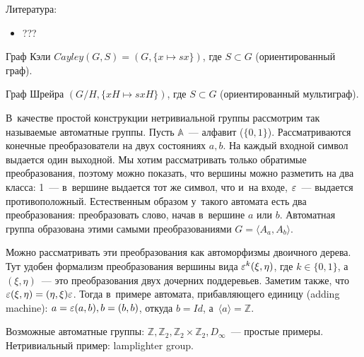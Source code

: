 \documentclass{article}
\begin{document}
Литература:
\begin{itemize}
	\item ???
\end{itemize}

\begin{definition}
	Граф Кэли $Cayley(G, S) = (G, \{x \mapsto sx\})$, где $S \subset G$ (ориентированный граф).
\end{definition}

\begin{definition}
	Граф Шрейра $(G / H, \{xH \mapsto sxH\})$, где $S \subset G$ (ориентированный мультиграф).
\end{definition}

В~качестве простой конструкции нетривиальной группы рассмотрим так называемые автоматные группы.
Пусть $\mathbb{A}$~--- алфавит ($\{0, 1\}$). Рассматриваются конечные преобразователи на двух
состояниях $a, b$. На каждый входной символ выдается один выходной.  Мы хотим рассматривать только
обратимые преобразования, поэтому можно показать, что вершины можно разметить на два класса:
1~--- в~вершине выдается тот же символ, что и~на входе, $\varepsilon$~--- выдается противоположный.
Естественным образом у~такого автомата есть два преобразования: преобразовать слово, начав
в~вершине $a$ или $b$. Автоматная группа образована этими самыми преобразованиями
$G = \langle A_a, A_b \rangle$.

Можно рассматривать эти преобразования как автоморфизмы двоичного дерева. Тут удобен формализм
преобразования вершины вида $\varepsilon^k (\xi, \eta)$, где $k \in \{0, 1\}$, а~$(\xi, \eta)$~--- это
преобразования двух дочерних поддеревьев. Заметим также, что $\varepsilon(\xi, \eta) = (\eta, \xi) \varepsilon$.
Тогда в~примере автомата, прибавляющего единицу (adding machine): $a = \varepsilon (a, b), b = (b, b)$,
откуда $b = Id$, а~$\langle a \rangle = \mathbb{Z}$.

Возможные автоматные группы: $\mathbb{Z}, \mathbb{Z}_2, \mathbb{Z}_2 \times \mathbb{Z}_2,
D_\infty$~--- простые примеры. Нетривиальный пример: lamplighter group.
\end{document}

